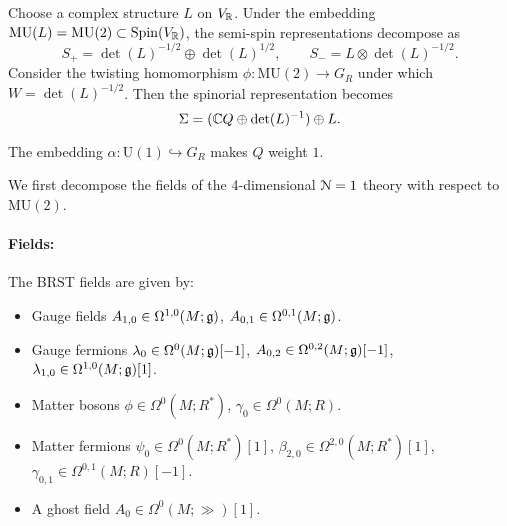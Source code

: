 \documentclass[10pt, oneside]{article}
\newcommand{\MU}{\mathrm{MU}}
\renewcommand{\U}{\mathrm{U}}
\begin{document}
Choose a complex structure $L$ on $V_\mathbb R$. Under the embedding $\MU(L) = \MU(2) \subset \Spin(V_\RR)$, the semi-spin representations decompose as
\[
S_+ = \det(L)^{-1/2} \oplus \det(L)^{1/2},\qquad S_- = L \otimes \det(L)^{-1/2} .
\]
Consider the twisting homomorphism $\phi\colon\MU(2)\rightarrow G_R$ under which $W = \det(L)^{-1/2}$. Then the spinorial representation becomes
\[\Sigma = (\mathbb C Q\oplus \det(L)^{-1})\oplus L.\]

The embedding $\alpha\colon \U(1)\hookrightarrow G_R$ makes $Q$ weight $1$.

We first decompose the fields of the 4-dimensional $\mathcal{N}=1$ theory with respect to $\MU(2)$.
\vspace{-10pt}
\paragraph{Fields:} The BRST fields are given by:
\begin{itemize}
\item Gauge fields $A_{1, 0} \in \Omega^{1, 0}(M; \mathfrak g)$, $A_{0, 1}\in\Omega^{0, 1}(M; \mathfrak g)$.
\item Gauge fermions $\lambda_0\in\Omega^0(M; \mathfrak g)[-1]$, $A_{0, 2}\in\Omega^{0, 2}(M; \mathfrak g)[-1]$, $\lambda_{1, 0}\in\Omega^{1, 0}(M; \mathfrak g)[1]$.
\item Matter bosons $\phi\in\Omega^0(M; R^*)$, $\gamma_0\in\Omega^0(M; R)$.
\item Matter fermions $\psi_0\in\Omega^0(M; R^*)[1]$, $\beta_{2, 0}\in\Omega^{2, 0}(M; R^*)[1]$, $\gamma_{0, 1}\in\Omega^{0, 1}(M; R)[-1]$.
\item A ghost field $A_0\in \Omega^0(M; \gg)[1]$.
\end{itemize}
\end{document}
